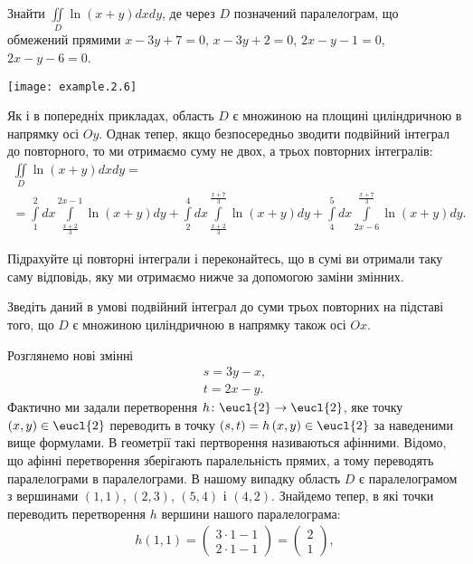 \begin{example}
Знайти ${\iint\limits_D \ln\left(x + y\right) d x d y}$, де через $D$ позначений паралелограм, що обмежений прямими ${x - 3y + 7 = 0}$, ${x - 3y + 2 = 0}$, ${2x - y - 1 = 0}$, ${2x - y - 6 = 0}$.

\texttt{[image: example.2.6]}

Як і в попередніх прикладах, область $D$ є множиною на площині циліндричною в напрямку осі ${Oy}$. Однак тепер, якщо безпосередньо зводити подвійний інтеграл до повторного, то ми отримаємо суму не двох, а трьох повторних інтегралів:
\[
\begin{array}{l}
\iint\limits_D \ln\left(x + y\right) d x d y =\\= \int\limits_1^2 d x \int\limits_{\frac{x+2}{3}}^{2 x - 1}\ln\left(x + y\right) d y + \int\limits_2^4 d x\int\limits_{\frac{x+2}{3}}^{\frac{x + 7}{3}}\ln\left(x + y\right) d y + \int\limits_4^5 d x\int\limits_{2 x - 6}^{\frac{x + 7}{3}}\ln\left(x + y\right) d y.
\end{array}
\]
\begin{exercise}
Підрахуйте ці повторні інтеграли і переконайтесь, що в сумі ви отримали таку саму відповідь, яку ми отримаємо нижче за допомогою заміни змінних.
\end{exercise}
\begin{exercise}
Зведіть даний в умові подвійний інтеграл до суми трьох повторних на підставі того, що $D$ є множиною циліндричною в напрямку також осі ${Ox}$.
\end{exercise}
Розглянемо нові змінні
\[
\begin{array}{c}
s = 3 y - x,\\
t = 2 x - y.
\end{array}
\]
Фактично ми задали перетворення ${h\colon \eucl{2}\to\eucl{2}}$, яке точку ${\left(x, y\right)\in\eucl{2}}$
 переводить в точку ${\left(s,t\right) = h\left(x,y\right)\in\eucl{2}}$ за наведеними вище формулами. В геометрії такі пертворення називаються афінними. Відомо, що афінні перетворення зберігають паралельність прямих, а тому переводять паралелограми в паралелограми. В нашому випадку область $D$ є паралелограмом з вершинами ${\left(1,1\right)}$, ${\left(2,3\right)}$, ${\left(5,4\right)}$ і ${\left(4,2\right)}$. Знайдемо тепер, в які точки переводить перетворення $h$ вершини нашого паралелограма:
 \[
 \begin{array}{c}
 h\left(1,1\right) = \left(\begin{array}{c}3\cdot1 - 1\\2\cdot 1 - 1\end{array}\right) = \left(\begin{array}{c}2\\1\end{array}\right),\\

\end{array}\]
\end{example}
